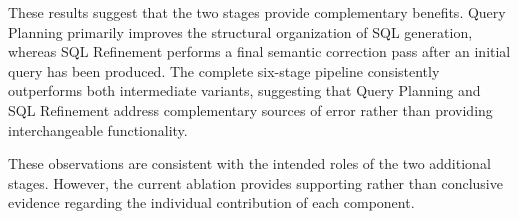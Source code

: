 \documentclass{svproc}
\begin{document}
These results suggest that the two stages provide complementary benefits. Query Planning primarily improves the structural organization of SQL generation, whereas SQL Refinement performs a final semantic correction pass after an initial query has been produced. The complete six-stage pipeline consistently outperforms both intermediate variants, suggesting that Query Planning and SQL Refinement address complementary sources of error rather than providing interchangeable functionality.


These observations are consistent with the intended roles of the two additional stages. However, the current ablation provides supporting rather than conclusive evidence regarding the individual contribution of each component.





\end{document}
